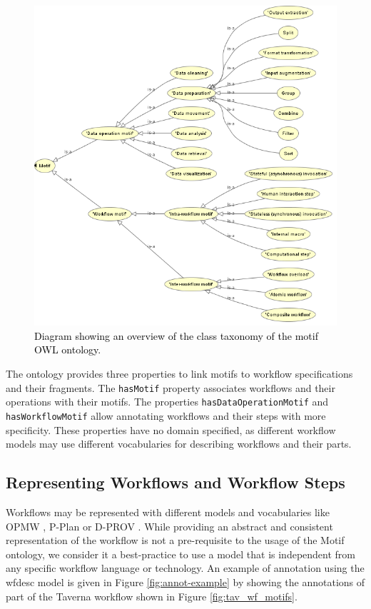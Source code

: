 \begin{figure}[t!]
\centering
\includegraphics[scale=0.60]{Figures/ontology.png}
\caption{\textcolor{black}{Diagram showing an overview of the class taxonomy of the motif OWL ontology.}}
\label{fig:ontology}
\end{figure}  

The ontology provides three properties to link motifs to workflow specifications and their fragments. The {\tt  hasMotif} property associates workflows and their operations with their motifs. The properties {\tt  hasDataOperationMotif} and {\tt  hasWorkflowMotif} allow annotating workflows and their steps with more specificity. These properties have no domain specified, as different workflow models may use different vocabularies for describing workflows and their parts. 

\subsection{Representing Workflows and Workflow Steps}
Workflows may be represented with different models and vocabularies like OPMW \cite{garijo_gil_2011}, P-Plan  \cite{garijo-gil-lisc12} or D-PROV \cite{Missier2013a}. While providing an abstract and consistent representation of the workflow is not a pre-requisite to the usage of the Motif ontology, we consider it a best-practice to use a model that is independent from any specific workflow language or technology. An example of annotation using the wfdesc model is given in Figure \ref{fig:annot-example} by showing the annotations of part of the Taverna workflow shown in Figure \ref{fig:tav_wf_motifs}. 

